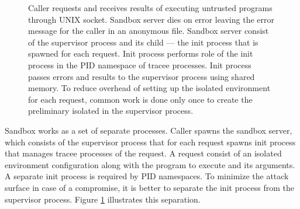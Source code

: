 \documentclass[en]{pracamgr}
\begin{document}
\begin{figure}[h]
\caption{Caller requests and receives results of executing untrusted programs through UNIX socket. Sandbox server dies on error leaving the error message for the caller in an anonymous file. Sandbox server consist of the supervisor process and its child --- the init process that is spawned for each request. Init process performs role of the init process in the PID namespace of tracee processes. Init process passes errors and results to the supervisor process using shared memory. To reduce overhead of setting up the isolated environment for each request, common work is done only once to create the preliminary isolated in the supervisor process.}
\label{fig:caller_to_sandbox_server_communication}
\end{figure}

Sandbox works as a set of separate processes. Caller spawns the sandbox server, which consists of the supervisor process that for each request spawns init process that manages tracee processes of the request. A request consist of an isolated environment configuration along with the program to execute and its arguments. A separate init process is required by PID namespaces. To minimize the attack surface in case of a compromise, it is better to separate the init process from the supervisor process. Figure \ref{fig:caller_to_sandbox_server_communication} illustrates this separation.
\end{document}
